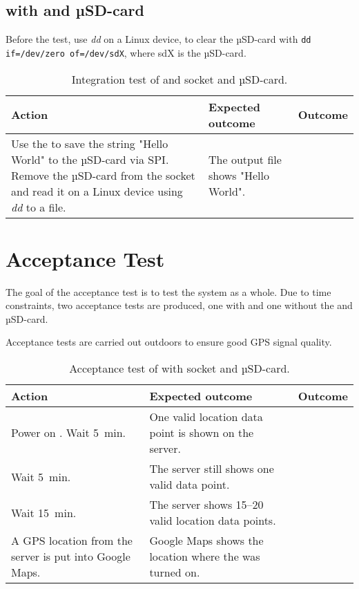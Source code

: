 \subsection{\MKR with \SDsock and µSD-card}
Before the test, use \textit{dd} on a Linux device, to clear the µSD-card with \texttt{dd if=/dev/zero of=/dev/sdX}, where sdX is the µSD-card.

\begin{table}[H]
	\centering
	\begin{tabularx}{\textwidth}{p{4.3cm} X X}
		\toprule
		\textbf{Action} & \textbf{Expected outcome} & \textbf{Outcome} \\
		\midrule
		Use the \MKR to save the string "Hello World" to the µSD-card via SPI.
		Remove the µSD-card from the \SDsock socket and read it on a Linux device using \textit{dd} to a file. & The output file shows "Hello World". & \\
		\bottomrule
	\end{tabularx}
	\caption{Integration test of \MKR and \SDsock socket and µSD-card.}
	\label{AT:intSD}
\end{table}

\section{Acceptance Test}
The goal of the acceptance test is to test the system as a whole.
Due to time constraints, two acceptance tests are produced, one with and one without the \SDsock and µSD-card.

Acceptance tests are carried out outdoors to ensure good GPS signal quality.

\begin{table}[H]
	\centering
	\begin{tabularx}{\textwidth}{p{4.3cm} X X}
		\toprule
		\textbf{Action} & \textbf{Expected outcome} & \textbf{Outcome} \\
		\midrule
		Power on \systemName. Wait \SI{5}{\minute}. & One valid location data point is shown on the server. & \\
		Wait \SI{5}{\minute}. & The server still shows one valid data point. & \\
		Wait \SI{15}{\minute}. & The server shows \numrange{15}{20} valid location data points. & \\
		A GPS location from the server is put into Google Maps. & Google Maps shows the location where the \systemName was turned on. & \\
		\bottomrule
	\end{tabularx}
	\caption{Acceptance test of \systemName with  \SDsock socket and µSD-card.}
	\label{AT:withSD}
\end{table}

